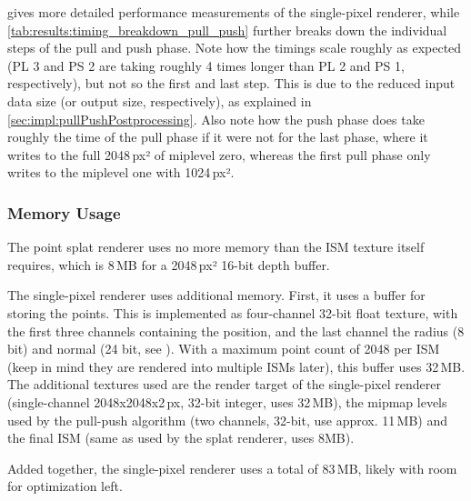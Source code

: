   gives more detailed performance measurements of the single-pixel renderer, while \cref{tab:results:timing_breakdown_pull_push} further breaks down the individual steps of the pull and push phase. Note how the timings scale roughly as expected (PL 3 and PS 2 are taking roughly 4 times longer than PL 2 and PS 1, respectively), but not so the first and last step. This is due to the reduced input data size (or output size, respectively), as explained in \cref{sec:impl:pullPushPostprocessing}. Also note how the push phase does take roughly the time of the pull phase if it were not for the last phase, where it writes to the full 2048\,px² of miplevel zero, whereas the first pull phase only writes to the miplevel one with 1024\,px².





 \subsubsection{Memory Usage}

 The point splat renderer uses no more memory than the ISM texture itself requires, which is 8\,MB for a 2048\,px² 16-bit depth buffer.

 The single-pixel renderer uses additional memory. First, it uses a buffer for storing the points. This is implemented as four-channel 32-bit float texture, with the first three channels containing the position, and the last channel the radius (8 bit) and normal (24 bit, see \cite{Cigolle:2014:NormalPacking}). With a maximum point count of 2048 per ISM (keep in mind they are rendered into multiple ISMs later), this buffer uses 32\,MB.
 The additional textures used are the render target of the single-pixel renderer (single-channel 2048x2048x2\,px, 32-bit integer, uses 32\,MB), the mipmap levels used by the pull-push algorithm (two channels, 32-bit, use approx. 11\,MB) and the final ISM (same as used by the splat renderer, uses 8MB).

 Added together, the single-pixel renderer uses a total of 83\,MB, likely with room for optimization left.


